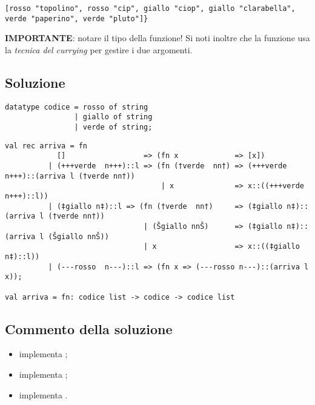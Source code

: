 \begin{lstlisting}
[rosso "topolino", rosso "cip", giallo "ciop", giallo "clarabella", verde "paperino", verde "pluto"]}
\end{lstlisting}

\medskip
\textbf{IMPORTANTE}: notare il tipo della funzione! Si noti inoltre che la funzione usa la \emph{tecnica del currying} per gestire i due argomenti.

\subsection{Soluzione}

\begin{lstlisting}[style = SML, nolol = true, caption = {Definizione del tipo di dato \sml{codice}}]
datatype codice = rosso of string
				| giallo of string
				| verde of string;
\end{lstlisting}

\begin{lstlisting}[style = SML, caption = {Definizione della funzione \sml{arriva}}]
val rec arriva = fn
		    []			  		=> (fn x 			 => [x])
		  | (+++verde  n+++)::l => (fn (†verde  nn†) => (+++verde n+++)::(arriva l (†verde nn†))
									| x				 => x::((+++verde n+++)::l))
		  | (‡giallo n‡)::l => (fn (†verde  nn†)	 => (‡giallo n‡)::(arriva l (†verde nn†))
		  					    | (Šgiallo nnŠ)		 => (‡giallo n‡)::(arriva l (Šgiallo nnŠ))
							    | x					 => x::((‡giallo n‡)::l))
		  | (---rosso  n---)::l => (fn x => (---rosso n---)::(arriva l x));

val arriva = fn: codice list -> codice -> codice list
\end{lstlisting}

\subsection{Commento della soluzione}

\begin{itemize}
	\item {} implementa ;
	\item {} implementa ;
	\item {} implementa .
\end{itemize}
